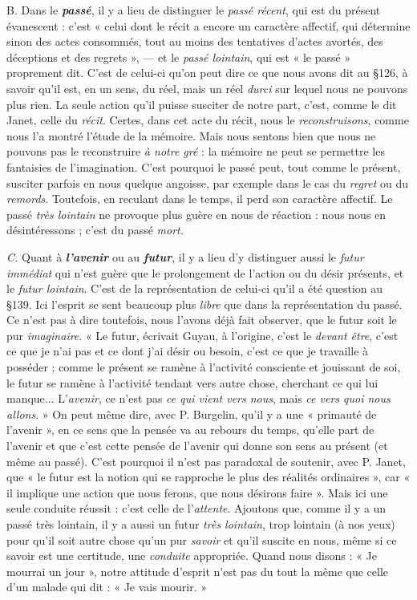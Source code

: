 {\it }B. Dans le \textbf{\textit {passé}}, il y a lieu de distinguer le {\it passé récent}, qui est du
présent évanescent : c’est « celui dont le récit a encore un caractère
affectif, qui détermine sinon des actes consommés, tout au moins des
tentatives d'actes avortés, des déceptions et des regrets », — et le
{\it passé lointain}, qui est « le passé » proprement dit. C’est de celui-ci
qu’on peut dire ce que nous avons dit au \S 126, à savoir qu'il est, en
un sens, du réel, mais un réel {\it durci} sur lequel nous ne pouvons plus
rien. La seule action qu’il puisse susciter de notre part, c’est, comme le
dit Janet, celle du {\it récit}. Certes, dans cet acte du récit, nous le
{\it reconstruisons}, comme nous l’a montré l’étude de la mémoire. Mais
nous sentons bien que nous ne pouvons pas le reconstruire {\it à notre
gré} : la mémoire ne peut se permettre les fantaisies de l’imagination.
C’est pourquoi le passé peut, tout comme le présent, susciter parfois
en nous quelque angoisse, par exemple dans le cas du {\it regret} ou du
{\it remords}. Toutefois, en reculant dans le temps, il perd son caractère
affectif. Le passé {\it très lointain} ne provoque plus guère en nous de
réaction : nous nous en désintéressons ; c’est du passé {\it mort.}

{\it C.} Quant à \textbf{\textit {l'avenir}} ou au \textbf{\textit {futur}}, il y a lieu d’y distinguer aussi le
{\it futur immédiat} qui n’est guère que le prolongement de l’action ou du
désir présents, et le {\it futur lointain}. C’est de la représentation de celui-ci
qu'il a été question au \S 139. Ici l'esprit se sent beaucoup plus {\it libre}
que dans la représentation du passé. Ce n’est pas à dire toutefois,
nous l'avons déjà fait observer, que le futur soit le pur {\it imaginaire}.
« Le futur, écrivait Guyau, à l’origine, c’est le {\it devant être}, c’est ce que
je n’ai pas et ce dont j'ai désir ou besoin, c’est ce que je travaille à
posséder ; comme le présent se ramène à l’activité consciente et jouissant
de soi, le futur se ramène à l’activité tendant vers autre chose,
cherchant ce qui lui manque... L'{\it avenir}, ce n’est pas {\it ce qui vient vers
nous}, mais {\it ce vers quoi nous allons}. » On peut même dire, avec P. Burgelin,
qu'il y a une « primauté de l'avenir », en ce sens que la pensée
va au rebours du temps, qu’elle part de l'avenir et que c'est cette
pensée de l’avenir qui donne son sens au présent (et même au passé).
C’est pourquoi il n’est pas paradoxal de soutenir, avec P. Janet, que
« le futur est la notion qui se rapproche le plus des réalités ordinaires »,
car « il implique une action que nous ferons, que nous désirons faire ».
Mais ici une seule conduite réussit : c’est celle de l’{\it attente}. Ajoutons
que, comme il y a un passé très lointain, il y a aussi un futur {\it très
lointain}, trop lointain (à nos yeux) pour qu’il soit autre chose qu’un
pur {\it savoir} et qu’il suscite en nous, même si ce savoir est une certitude,
une {\it conduite} appropriée. Quand nous disons : « Je mourrai un jour »,
notre attitude d'esprit n’est pas du tout la même que celle d’un malade
qui dit : « Je vais mourir. »

